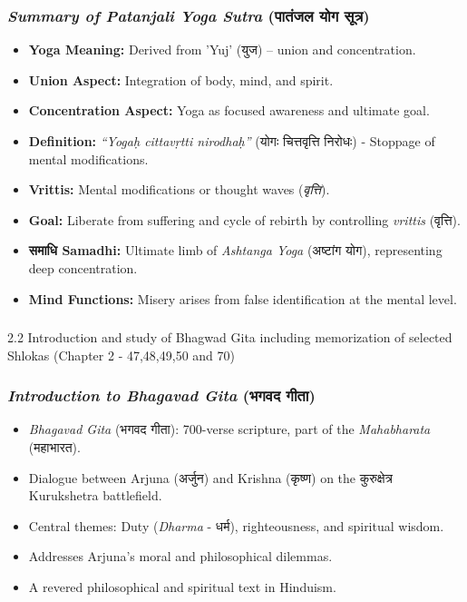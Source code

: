 \begin{frame}[fragile]\frametitle{\textit{Summary of Patanjali Yoga Sutra} (पातंजल योग सूत्र)}

    \begin{itemize}
        \item \textbf{Yoga Meaning:} Derived from 'Yuj' (युज) – union and concentration.
        \item \textbf{Union Aspect:} Integration of body, mind, and spirit.
        \item \textbf{Concentration Aspect:} Yoga as focused awareness and ultimate goal.
        \item \textbf{Definition:} \textit{“Yogaḥ cittavṛtti nirodhaḥ”} (योगः चित्तवृत्ति निरोधः) - Stoppage of mental modifications.
        \item \textbf{Vrittis:} Mental modifications or thought waves (\textit{वृत्ति}).
        \item \textbf{Goal:} Liberate from suffering and cycle of rebirth by controlling \textit{vrittis} (वृत्ति).
        \item \textbf{समाधि Samadhi:} Ultimate limb of \textit{Ashtanga Yoga} (अष्टांग योग), representing deep concentration.
        \item \textbf{Mind Functions:} Misery arises from false identification at the mental level.
    \end{itemize}

\end{frame}


\begin{frame}[fragile]\frametitle{}
\begin{center}
{\Large 2.2 Introduction and study of Bhagwad Gita including memorization of selected Shlokas (Chapter 2 - 47,48,49,50 and 70)}
\end{center}
\end{frame}

\begin{frame}[fragile]\frametitle{\textit{Introduction to Bhagavad Gita} (भगवद गीता)} 
	\begin{itemize} 
		\item \textit{Bhagavad Gita} (भगवद गीता): 700-verse scripture, part of the \textit{Mahabharata} (महाभारत). 
		\item Dialogue between Arjuna (अर्जुन) and Krishna (कृष्ण) on the कुरुक्षेत्र  Kurukshetra battlefield. 
		\item Central themes: Duty (\textit{Dharma} - धर्म), righteousness, and spiritual wisdom. 
		\item Addresses Arjuna's moral and philosophical dilemmas. 
		\item A revered philosophical and spiritual text in Hinduism. 
	\end{itemize} 
\end{frame}

